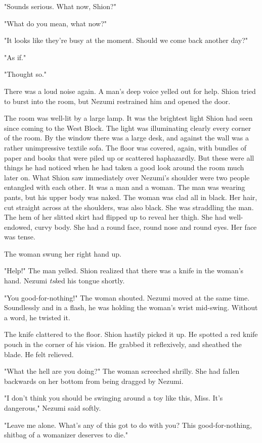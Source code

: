 "Sounds serious. What now, Shion?"

"What do you mean, what now?"

"It looks like they're busy at the moment. Should we come back another
day?"

"As if."

"Thought so."

There was a loud noise again. A man's deep voice yelled out for help.
Shion tried to burst into the room, but Nezumi restrained him and opened
the door.

The room was well-lit by a large lamp. It was the brightest light Shion
had seen since coming to the West Block. The light was illuminating
clearly every corner of the room. By the window there was a large desk,
and against the wall was a rather unimpressive textile sofa. The floor
was covered, again, with bundles of paper and books that were piled up
or scattered haphazardly. But these were all things he had noticed when
he had taken a good look around the room much later on. What Shion saw
immediately over Nezumi's shoulder were two people entangled with each
other. It was a man and a woman. The man was wearing pants, but his
upper body was naked. The woman was clad all in black. Her hair, cut
straight across at the shoulders, was also black. She was straddling the
man. The hem of her slitted skirt had flipped up to reveal her thigh.
She had well-endowed, curvy body. She had a round face, round nose and
round eyes. Her face was tense.

The woman swung her right hand up.

"Help!" The man yelled. Shion realized that there was a knife in the
woman's hand. Nezumi \emph{tsk}ed his tongue shortly.

"You good-for-nothing!" The woman shouted. Nezumi moved at the same
time. Soundlessly and in a flash, he was holding the woman's wrist
mid-swing. Without a word, he twisted it.

The knife clattered to the floor. Shion hastily picked it up. He spotted
a red knife pouch in the corner of his vision. He grabbed it
reflexively, and sheathed the blade. He felt relieved.

"What the hell are you doing?" The woman screeched shrilly. She had
fallen backwards on her bottom from being dragged by Nezumi.

"I don't think you should be swinging around a toy like this, Miss. It's
dangerous," Nezumi said softly.

"Leave me alone. What's any of this got to do with you? This
good-for-nothing, shitbag of a womanizer deserves to die."

